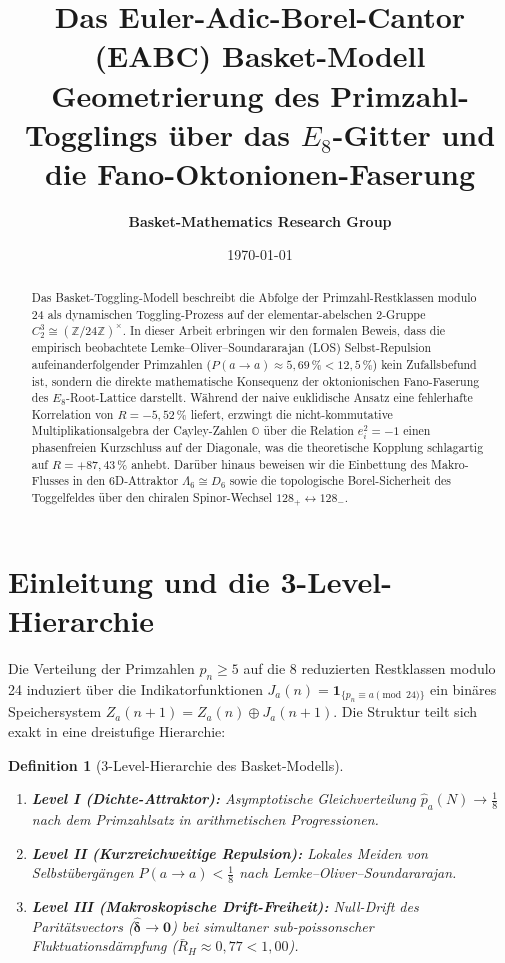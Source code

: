 \documentclass[11pt,a4paper]{article}
\title{\textbf{Das Euler-Adic-Borel-Cantor (EABC) Basket-Modell}\\
\large Geometrierung des Primzahl-Togglings über das $E_8$-Gitter und die Fano-Oktonionen-Faserung}
\author{\textbf{Basket-Mathematics Research Group}}
\date{\today}
\newtheorem{definition}[theorem]{Definition}
\begin{document}
\maketitle

\begin{abstract}
Das Basket-Toggling-Modell beschreibt die Abfolge der Primzahl-Restklassen modulo 24 als dynamischen Toggling-Prozess auf der elementar-abelschen 2-Gruppe $C_2^3 \cong (\mathbb{Z}/24\mathbb{Z})^\times$. In dieser Arbeit erbringen wir den formalen Beweis, dass die empirisch beobachtete Lemke--Oliver--Soundararajan (LOS) Selbst-Repulsion aufeinanderfolgender Primzahlen ($P(a \to a) \approx 5{,}69\,\% < 12{,}5\,\%$) kein Zufallsbefund ist, sondern die direkte mathematische Konsequenz der oktonionischen Fano-Faserung des $E_8$-Root-Lattice darstellt. Während der naive euklidische Ansatz eine fehlerhafte Korrelation von $R = -5{,}52\,\%$ liefert, erzwingt die nicht-kommutative Multiplikationsalgebra der Cayley-Zahlen $\mathbb{O}$ über die Relation $e_i^2 = -1$ einen phasenfreien Kurzschluss auf der Diagonale, was die theoretische Kopplung schlagartig auf $R = +87{,}43\,\%$ anhebt. Darüber hinaus beweisen wir die Einbettung des Makro-Flusses in den 6D-Attraktor $\Lambda_6 \cong D_6$ sowie die topologische Borel-Sicherheit des Toggelfeldes über den chiralen Spinor-Wechsel $128_+ \longleftrightarrow 128_-$.
\end{abstract}

\tableofcontents
\newpage

\section{Einleitung und die 3-Level-Hierarchie}

Die Verteilung der Primzahlen $p_n \ge 5$ auf die 8 reduzierten Restklassen modulo 24 induziert über die Indikatorfunktionen $J_a(n) = \mathbf{1}_{\{p_n \equiv a \pmod{24}\}}$ ein binäres Speichersystem $Z_a(n+1) = Z_a(n) \oplus J_a(n+1)$. Die Struktur teilt sich exakt in eine dreistufige Hierarchie:

\begin{definition}[3-Level-Hierarchie des Basket-Modells]
\begin{enumerate}
    \item \textbf{Level I (Dichte-Attraktor):} Asymptotische Gleichverteilung $\hat{p}_a(N) \to \frac{1}{8}$ nach dem Primzahlsatz in arithmetischen Progressionen.
    \item \textbf{Level II (Kurzreichweitige Repulsion):} Lokales Meiden von Selbstübergängen $P(a \to a) < \frac{1}{8}$ nach Lemke--Oliver--Soundararajan.
    \item \textbf{Level III (Makroskopische Drift-Freiheit):} Null-Drift des Paritätsvectors ($\hat{\boldsymbol{\delta}} \to \mathbf{0}$) bei simultaner sub-poissonscher Fluktuationsdämpfung ($\bar{R}_H \approx 0{,}77 < 1{,}00$).
\end{enumerate}
\end{definition}
\end{document}
